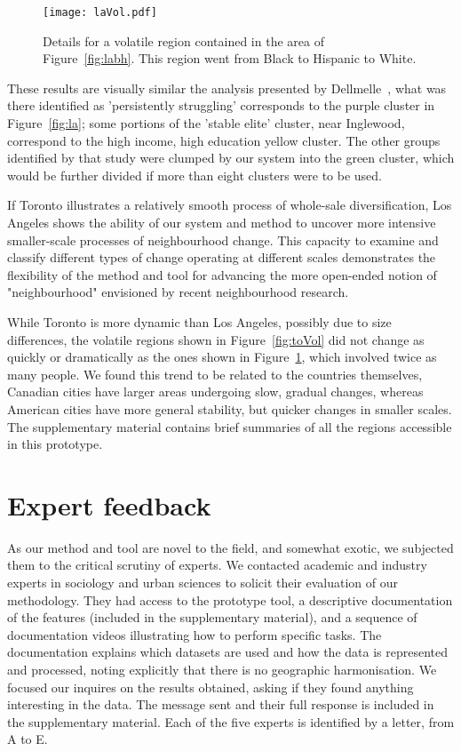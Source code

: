 \begin{figure}
    \centering 
    \texttt{[image: laVol.pdf]}
    \caption{Details for a volatile region contained in the area of
         Figure~\ref{fig:labh}. This region went from Black to Hispanic to
        White.\label{fig:laVol}}
\end{figure}


These results are visually similar the analysis presented by
Dellmelle~\citep{Delmelle2016}, what was there identified as 'persistently
struggling' corresponds to the purple cluster in Figure~\ref{fig:la}; some
portions of the 'stable elite' cluster, near Inglewood, correspond to the high
income, high education yellow cluster. The other groups identified by that study
were clumped by our system into the green cluster, which would be further
divided if more than eight clusters were to be used. 

If Toronto illustrates a relatively smooth process of whole-sale
diversification, Los Angeles shows the ability of our system and method to
uncover more intensive smaller-scale processes of neighbourhood change. This
capacity to examine and classify different types of change operating at
different scales demonstrates the flexibility of the method and tool for
advancing the more open-ended notion of "neighbourhood" envisioned by recent
neighbourhood research. 



\smallskip While Toronto is more dynamic than Los Angeles, possibly due to size
differences, the volatile regions shown in Figure~\ref{fig:toVol} did not change
as quickly or dramatically as the ones shown in Figure~\ref{fig:laVol}, which
involved twice as many people. We found this trend to be related to the
countries themselves, Canadian cities have larger areas undergoing slow, gradual
changes, whereas American cities have more general stability, but quicker
changes in smaller scales. The supplementary material contains brief summaries
of all the regions accessible in this prototype.





\section{Expert feedback}
\label{sec:expert}
As our method and tool are novel to the field, and somewhat exotic,  we
subjected them to the critical scrutiny of experts. We contacted academic and
industry experts in sociology and urban sciences to solicit their evaluation of
our methodology. They had access to the prototype tool, a descriptive
documentation of the features (included in the supplementary material), and a
sequence of documentation videos illustrating how to perform specific tasks. The
documentation explains which datasets are used and how the data is represented
and processed, noting explicitly that there is no geographic harmonisation. We
focused our inquires on the results obtained, asking if they found anything
interesting in the data. The message sent and their full response is included in
the supplementary material. Each of the five experts is identified by a letter,
from A to E. 



